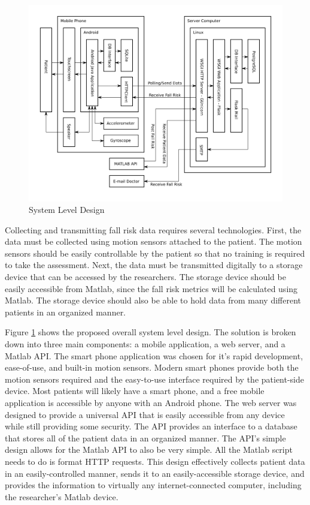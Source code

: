 \documentclass[conference]{IEEEtran}
\begin{document}
\begin{figure}[!htb]
    \centering
    \includegraphics[scale=0.3]{img/systemdesign.png}
    \caption{System Level Design}
    \label{systemleveldesign}
\end{figure}

Collecting and transmitting fall risk data requires several technologies. First, the data must be collected using motion sensors attached to the patient. The motion sensors should be easily controllable by the patient so that no training is required to take the assessment. Next, the data must be transmitted digitally to a storage device that can be accessed by the researchers. The storage device should be easily accessible from Matlab, since the fall risk metrics will be calculated using Matlab. The storage device should also be able to hold data from many different patients in an organized manner.

Figure \ref{systemleveldesign} shows the proposed overall system level design. The solution is broken down into three main components: a mobile application, a web server, and a Matlab API. The smart phone application was chosen for it's rapid development, ease-of-use, and built-in motion sensors. Modern smart phones provide both the motion sensors required and the easy-to-use interface required by the patient-side device. Most patients will likely have a smart phone, and a free mobile application is accessible by anyone with an Android phone. The web server was designed to provide a universal API that is easily accessible from any device while still providing some security. The API provides an interface to a database that stores all of the patient data in an organized manner. The API's simple design allows for the Matlab API to also be very simple. All the Matlab script needs to do is format HTTP requests. This design effectively collects patient data in an easily-controlled manner, sends it to an easily-accessible storage device, and provides the information to virtually any internet-connected computer, including the researcher's Matlab device.
\end{document}
